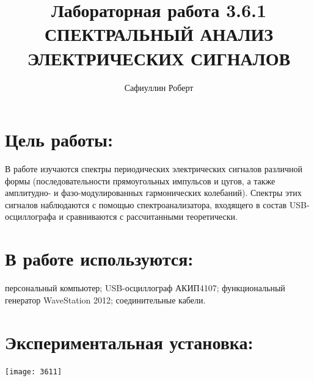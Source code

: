 \documentclass[a4paper,12pt]{article} %
\author{Сафиуллин Роберт	}
\title{Лабораторная работа 3.6.1\\ СПЕКТРАЛЬНЫЙ АНАЛИЗ ЭЛЕКТРИЧЕСКИХ СИГНАЛОВ}
\begin{document}

\maketitle


\newpage
\section{Цель работы:}
  В работе изучаются спектры периодических электрических сигналов
различной формы (последовательности прямоугольных импульсов и цугов,
а также амплитудно- и фазо-модулированных гармонических колебаний).
Спектры этих сигналов наблюдаются с помощью спектроанализатора, входящего
в состав USB-осциллографа и сравниваются с рассчитанными теоретически.
\\
\section{В работе используются:}
персональный компьютер; USB-осциллограф АКИП4107;
функциональный генератор WaveStation 2012; соединительные кабели.

 
\section{Экспериментальная установка:}

 \texttt{[image: 3611]}
\end{document}
